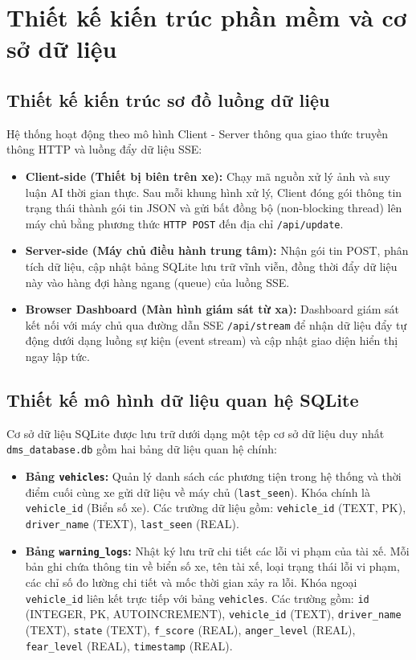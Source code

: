 \documentclass[../DoAn.tex]{subfiles}
\begin{document}
\section{Thiết kế kiến trúc phần mềm và cơ sở dữ liệu}
\label{section:4.6}

\subsection{Thiết kế kiến trúc sơ đồ luồng dữ liệu}
Hệ thống hoạt động theo mô hình Client - Server thông qua giao thức truyền thông HTTP và luồng đẩy dữ liệu SSE:
\begin{itemize}
    \item \textbf{Client-side (Thiết bị biên trên xe):} Chạy mã nguồn xử lý ảnh và suy luận AI thời gian thực. Sau mỗi khung hình xử lý, Client đóng gói thông tin trạng thái thành gói tin JSON và gửi bất đồng bộ (non-blocking thread) lên máy chủ bằng phương thức \texttt{HTTP POST} đến địa chỉ \texttt{/api/update}.
    \item \textbf{Server-side (Máy chủ điều hành trung tâm):} Nhận gói tin POST, phân tích dữ liệu, cập nhật bảng SQLite lưu trữ vĩnh viễn, đồng thời đẩy dữ liệu này vào hàng đợi hàng ngang (queue) của luồng SSE.
    \item \textbf{Browser Dashboard (Màn hình giám sát từ xa):} Dashboard giám sát kết nối với máy chủ qua đường dẫn SSE \texttt{/api/stream} để nhận dữ liệu đẩy tự động dưới dạng luồng sự kiện (event stream) và cập nhật giao diện hiển thị ngay lập tức.
\end{itemize}

\subsection{Thiết kế mô hình dữ liệu quan hệ SQLite}
Cơ sở dữ liệu SQLite được lưu trữ dưới dạng một tệp cơ sở dữ liệu duy nhất \texttt{dms\_database.db} gồm hai bảng dữ liệu quan hệ chính:
\begin{itemize}
    \item \textbf{Bảng \texttt{vehicles}:} Quản lý danh sách các phương tiện trong hệ thống và thời điểm cuối cùng xe gửi dữ liệu về máy chủ (\texttt{last\_seen}). Khóa chính là \texttt{vehicle\_id} (Biển số xe). Các trường dữ liệu gồm: \texttt{vehicle\_id} (TEXT, PK), \texttt{driver\_name} (TEXT), \texttt{last\_seen} (REAL).
    \item \textbf{Bảng \texttt{warning\_logs}:} Nhật ký lưu trữ chi tiết các lỗi vi phạm của tài xế. Mỗi bản ghi chứa thông tin về biển số xe, tên tài xế, loại trạng thái lỗi vi phạm, các chỉ số đo lường chi tiết và mốc thời gian xảy ra lỗi. Khóa ngoại \texttt{vehicle\_id} liên kết trực tiếp với bảng \texttt{vehicles}. Các trường gồm: \texttt{id} (INTEGER, PK, AUTOINCREMENT), \texttt{vehicle\_id} (TEXT), \texttt{driver\_name} (TEXT), \texttt{state} (TEXT), \texttt{f\_score} (REAL), \texttt{anger\_level} (REAL), \texttt{fear\_level} (REAL), \texttt{timestamp} (REAL).
\end{itemize}
\end{document}
